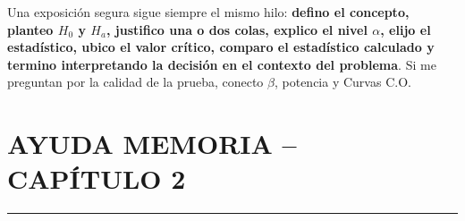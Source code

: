 \documentclass[11pt,a4paper]{article}
\begin{document}
\begin{oral}
Una exposición segura sigue siempre el mismo hilo: \textbf{defino el concepto, planteo $H_0$ y $H_a$, justifico una o dos colas, explico el nivel $\alpha$, elijo el estadístico, ubico el valor crítico, comparo el estadístico calculado y termino interpretando la decisión en el contexto del problema}. Si me preguntan por la calidad de la prueba, conecto $\beta$, potencia y Curvas C.O.
\end{oral}

\newpage
{}
\pagestyle{plain}
\section*{AYUDA MEMORIA -- CAPÍTULO 2}
\vspace{-3mm}\hrule\vspace{2mm}
\footnotesize
\setlength{\columnsep}{7mm}
\end{document}
